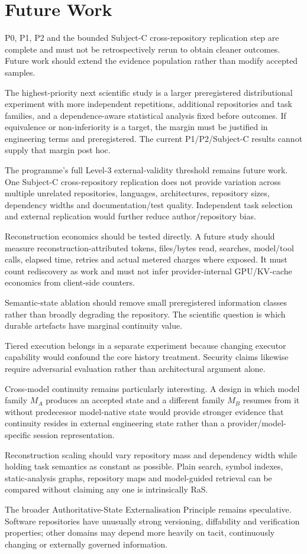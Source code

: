 \section{Future Work}
\label{sec:future}

P0, P1, P2 and the bounded Subject-C cross-repository replication step are complete and must not be retrospectively rerun to obtain cleaner outcomes. Future work should extend the evidence population rather than modify accepted samples.

The highest-priority next scientific study is a larger preregistered distributional experiment with more independent repetitions, additional repositories and task families, and a dependence-aware statistical analysis fixed before outcomes. If equivalence or non-inferiority is a target, the margin must be justified in engineering terms and preregistered. The current P1/P2/Subject-C results cannot supply that margin post hoc.

The programme's full Level-3 external-validity threshold remains future work. One Subject-C cross-repository replication does not provide variation across multiple unrelated repositories, languages, architectures, repository sizes, dependency widths and documentation/test quality. Independent task selection and external replication would further reduce author/repository bias.

Reconstruction economics should be tested directly. A future study should measure reconstruction-attributed tokens, files/bytes read, searches, model/tool calls, elapsed time, retries and actual metered charges where exposed. It must count rediscovery as work and must not infer provider-internal GPU/KV-cache economics from client-side counters.

Semantic-state ablation should remove small preregistered information classes rather than broadly degrading the repository. The scientific question is which durable artefacts have marginal continuity value.

Tiered execution belongs in a separate experiment because changing executor capability would confound the core history treatment. Security claims likewise require adversarial evaluation rather than architectural argument alone.

Cross-model continuity remains particularly interesting. A design in which model family $M_A$ produces an accepted state and a different family $M_B$ resumes from it without predecessor model-native state would provide stronger evidence that continuity resides in external engineering state rather than a provider/model-specific session representation.

Reconstruction scaling should vary repository mass and dependency width while holding task semantics as constant as possible. Plain search, symbol indexes, static-analysis graphs, repository maps and model-guided retrieval can be compared without claiming any one is intrinsically RaS.

The broader Authoritative-State Externalisation Principle remains speculative. Software repositories have unusually strong versioning, diffability and verification properties; other domains may depend more heavily on tacit, continuously changing or externally governed information.
